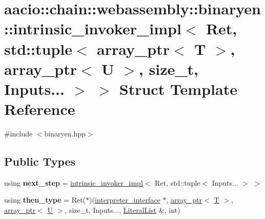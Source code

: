 \hypertarget{structaacio_1_1chain_1_1webassembly_1_1binaryen_1_1intrinsic__invoker__impl_3_01_ret_00_01std_1_bb369d557572a35c29e4f57bf73f5335}{}\section{aacio\+:\+:chain\+:\+:webassembly\+:\+:binaryen\+:\+:intrinsic\+\_\+invoker\+\_\+impl$<$ Ret, std\+:\+:tuple$<$ array\+\_\+ptr$<$ T $>$, array\+\_\+ptr$<$ U $>$, size\+\_\+t, Inputs... $>$ $>$ Struct Template Reference}
\label{structaacio_1_1chain_1_1webassembly_1_1binaryen_1_1intrinsic__invoker__impl_3_01_ret_00_01std_1_bb369d557572a35c29e4f57bf73f5335}


{\ttfamily \#include $<$binaryen.\+hpp$>$}

\subsection*{Public Types}
\begin{DoxyCompactItemize}
\item 
\mbox{\label{structaacio_1_1chain_1_1webassembly_1_1binaryen_1_1intrinsic__invoker__impl_3_01_ret_00_01std_1_bb369d557572a35c29e4f57bf73f5335_a25ce81c8656aaa572b79223b1c547cc0}} 
using {\bfseries next\+\_\+step} = \mbox{\hyperlink{structaacio_1_1chain_1_1webassembly_1_1binaryen_1_1intrinsic__invoker__impl}{intrinsic\+\_\+invoker\+\_\+impl}}$<$ Ret, std\+::tuple$<$ Inputs... $>$ $>$
\item 
\mbox{\label{structaacio_1_1chain_1_1webassembly_1_1binaryen_1_1intrinsic__invoker__impl_3_01_ret_00_01std_1_bb369d557572a35c29e4f57bf73f5335_a363ba3409be2f4bb5cfbf1eb80e26495}} 
using {\bfseries then\+\_\+type} = Ret($\ast$)(\mbox{\hyperlink{structaacio_1_1chain_1_1webassembly_1_1binaryen_1_1interpreter__interface}{interpreter\+\_\+interface}} $\ast$, \mbox{\hyperlink{structaacio_1_1chain_1_1array__ptr}{array\+\_\+ptr}}$<$ \mbox{\hyperlink{struct_t}{T}} $>$, \mbox{\hyperlink{structaacio_1_1chain_1_1array__ptr}{array\+\_\+ptr}}$<$ \mbox{\hyperlink{union_u}{U}} $>$, size\+\_\+t, Inputs..., \mbox{\hyperlink{classstd_1_1vector}{Literal\+List}} \&, int)
\end{DoxyCompactItemize}
